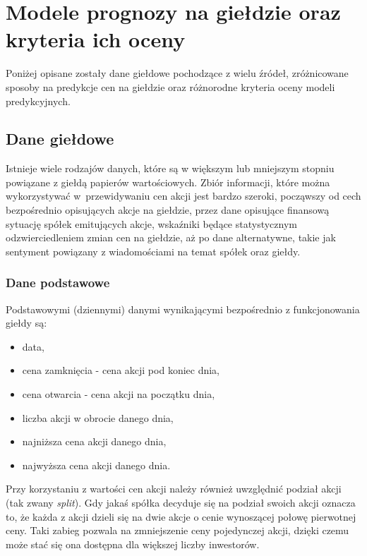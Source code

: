 \documentclass[a4paper, twoside, 11pt, openright]{article}
\begin{document}
\newpage

\section{Modele prognozy na giełdzie oraz kryteria ich oceny}

Poniżej opisane zostały dane giełdowe pochodzące z wielu źródeł, zróżnicowane sposoby na predykcje cen na giełdzie oraz różnorodne kryteria oceny modeli predykcyjnych. 

\subsection{Dane giełdowe}

Istnieje wiele rodzajów danych, które są w większym lub mniejszym stopniu powiązane z giełdą papierów wartościowych. Zbiór informacji, które można wykorzystywać w~przewidywaniu cen akcji jest bardzo szeroki, począwszy od cech bezpośrednio opisujących akcje na giełdzie, przez dane opisujące finansową sytuację spółek emitujących akcje, wskaźniki będące statystycznym odzwierciedleniem zmian cen na giełdzie, aż po dane alternatywne, takie jak sentyment powiązany z wiadomościami na temat spółek oraz giełdy.

\subsubsection{Dane podstawowe}

Podstawowymi (dziennymi) danymi wynikającymi bezpośrednio z funkcjonowania giełdy są:

\begin{itemize}
\item{data},
\item{cena zamknięcia} - cena akcji pod koniec dnia,
\item{cena otwarcia} - cena akcji na początku dnia,
\item{liczba akcji w obrocie danego dnia},
\item{najniższa cena akcji danego dnia},
\item{najwyższa cena akcji danego dnia}.
\end{itemize}

 Przy korzystaniu z wartości cen akcji należy również uwzględnić podział akcji (tak zwany \textit{split}). Gdy jakaś spółka decyduje się na podział swoich akcji oznacza to, że każda z akcji dzieli się na dwie akcje o cenie wynoszącej połowę pierwotnej ceny. Taki zabieg pozwala na zmniejszenie ceny pojedynczej akcji, dzięki czemu może stać się ona dostępna dla większej liczby inwestorów. 
 
\end{document}
